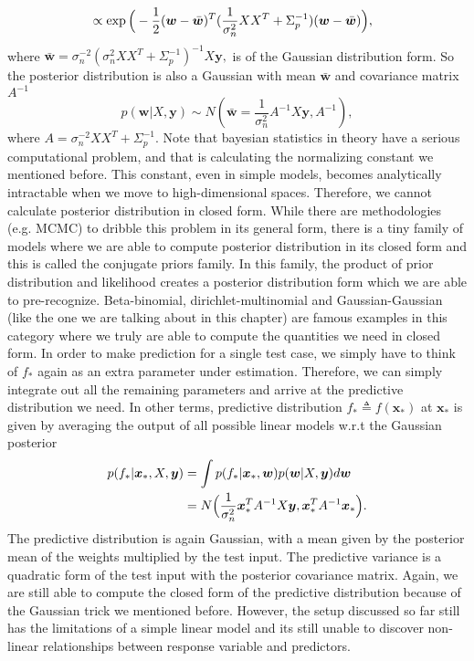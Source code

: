 \documentclass[12pt,a4paper,oneside]{book}
\theoremstyle{plain}
\theoremstyle{definition}
\begin{document}
{\begin{align*}
&\propto\exp \Big{(} -\frac{1}{2}(\bm{w}-\bar{\bm{w}})^T (\frac{1}{\sigma_n^2}XX^T + \Sigma_p^{-1})(\bm{w}-\bar{\bm{w}})\Big{)},
\end{align*}
where $\bar{\bm{w}}=\sigma_n^{-2}(\sigma_n^2 XX^T + \Sigma_p^{-1})^{-1}X\bm{y},$ is of the Gaussian distribution form. So the posterior distribution is also a Gaussian with mean $\bar{\bm{w}}$ and covariance matrix $A^{-1}$ $$p(\bm{w}|X,\bm{y})\sim N(\bar{\bm{w}}=\frac{1}{\sigma_n^2}A^{-1}X\bm{y},A^{-1}),$$ where $A=\sigma_n^{-2}XX^T + \Sigma_p^{-1}.$
\vspace{3mm}\newline
Note that bayesian statistics in theory have a serious computational problem, and that is calculating the normalizing constant we mentioned before. This constant, even in simple models, becomes analytically intractable when we move to high-dimensional spaces. Therefore, we cannot calculate posterior distribution in closed form. While there are methodologies (e.g. MCMC) to dribble this problem in its general form, there is a tiny family of models where we are able to compute posterior distribution in its closed form and this is called the conjugate priors family. In this family, the product of prior distribution and likelihood creates a posterior distribution form which we are able to pre-recognize. Beta-binomial, dirichlet-multinomial and Gaussian-Gaussian (like the one we are talking about in this chapter) are famous examples in this category where we truly are able to compute the quantities we need in closed form. 
\vspace{6mm}\newline
In order to make prediction for a single test case, we simply have to think of $f_*$ again as an extra parameter under estimation. Therefore, we can simply integrate out all the remaining parameters and arrive at the predictive distribution we need. In other terms, predictive distribution $f_*\triangleq f(\bm{x}_*)$ at $\bm{x}_*$ is given by averaging the output of all possible linear models w.r.t the Gaussian posterior 
\begin{align*}
p(f_*|\bm{x}_*,X,\bm{y})&=\int p(f_*|\bm{x}_*,\bm{w})p(\bm{w}|X,\bm{y})d\bm{w}\\
&= N\Big{(}\frac{1}{\sigma_n^2}\bm{x}_*^T A^{-1}X\bm{y}, \bm{x}_*^T A^{-1}\bm{x}_*\Big{)}.
\end{align*}
The predictive distribution is again Gaussian, with a mean given by the posterior mean of the weights  multiplied by the test input. The predictive variance is a quadratic form of the test input with the posterior covariance matrix. Again, we are still able to compute the closed form of the predictive distribution because of the Gaussian trick we mentioned before. However, the setup discussed so far still has the limitations of a simple linear model and its still unable to discover non-linear relationships between response variable and predictors. 
\begin{center}


\end{center}}
\end{document}
